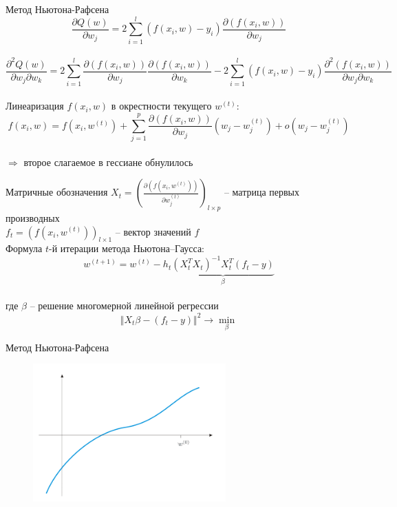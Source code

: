 \documentclass[10pt]{beamer}
\begin{document}
\begin{frame}{Метод Ньютона-Рафсена}
	$$\frac{\partial Q(w)}{\partial w_j} = 2 \sum\limits_{i=1}^l (f(x_i, w) - y_i ) \frac{\partial(f(x_i, w))}{\partial w_j}$$\\
	\pause
	$$\frac{\partial^2 Q(w)}{\partial w_j \partial w_k} = 2 \sum\limits_{i=1}^l \frac{\partial(f(x_i, w))}{\partial w_j} \frac{\partial(f(x_i, w))}{\partial w_k} - 2 \sum\limits_{i=1}^l (f(x_i, w) - y_i ) \frac{\partial^2 (f(x_i, w))}{\partial w_j \partial w_k}$$\\
	\bigbreak
	\pause
	Линеаризация $f(x_i, w)$ в окрестности текущего $w^{(t)}$:\\
	$$f(x_i, w) = f(x_i, w^{(t)}) + \sum\limits_{j=1}^p \frac{\partial(f(x_i, w))}{\partial w_j} (w_j - w_j^{(t)}) + o(w_j -w_j^{(t)})$$\\
	$\Rightarrow$ второе слагаемое в гессиане обнулилось
\end{frame}

\begin{frame}{Матричные обозначения}
	$X_t = \left(\frac{\partial(f(x_i, w^{(t)}))}{\partial w_j^{(t)}}\right)_{l \times p}$ -- матрица первых производных\\
	$f_t = \left( f(x_i, w^{(t)}) \right)_{l \times 1}$ -- вектор значений $f$\\
	\bigbreak
	Формула $t$-й итерации метода Ньютона–Гаусса:\\
	$$w^{(t+1)} = w^{(t)} - h_t \underbrace{\left( X^T_t X_t \right)^{-1} X_t^T(f_t -y)}_{\beta}$$\\
	где $\beta$ -- решение многомерной линейной регрессии\\
	$$\Vert X_t\beta - (f_t-y) \Vert^2 \rightarrow \min_{\beta}$$ 
\end{frame}

\begin{frame}{Метод Ньютона-Рафсена}
	\begin{figure}[htbp]
	  \includegraphics[height=150pt, keepaspectratio = true]{images/newton-1}   
	\end{figure}
\end{frame}
\end{document}
